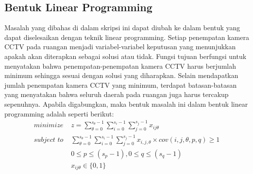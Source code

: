 \subsection{Bentuk Linear Programming}
Masalah yang dibahas di dalam skripsi ini dapat diubah ke dalam bentuk yang dapat diselesaikan dengan teknik linear programming. Setiap penempatan kamera CCTV pada ruangan menjadi variabel-variabel keputusan yang menunjukkan apakah akan diterapkan sebagai solusi atau tidak. Fungsi tujuan berfungsi untuk menyatakan bahwa penempatan-penempatan kamera CCTV harus berjumlah minimum sehingga sesuai dengan solusi yang diharapkan. Selain mendapatkan jumlah penempatan kamera CCTV yang minimum, terdapat batasan-batasan yang menyatakan bahwa seluruh daerah pada ruangan juga harus tercakup sepenuhnya. Apabila digabungkan, maka bentuk masalah ini dalam bentuk linear programming adalah seperti berikut:
\begin{equation*}
	\begin{split}
		\textit{minimize } & z = \sum_{\theta=0}^{s_{\theta}-1} \sum_{i=0}^{s_i-1} \sum_{j=0}^{s_j-1} x_{ij\theta}\\
		\textit{subject to } & \sum_{\theta=0}^{s_{\theta}-1} \sum_{i=0}^{s_i-1} \sum_{j=0}^{s_j-1} x_{i,j,\theta} \times cov(i,j,\theta,p,q) \geq 1\\
		& 0 \leq p \leq (s_p - 1), 0 \leq q \leq (s_q - 1)\\
		& x_{ij\theta} \in \{0,1\}
	\end{split}
\end{equation*}

















